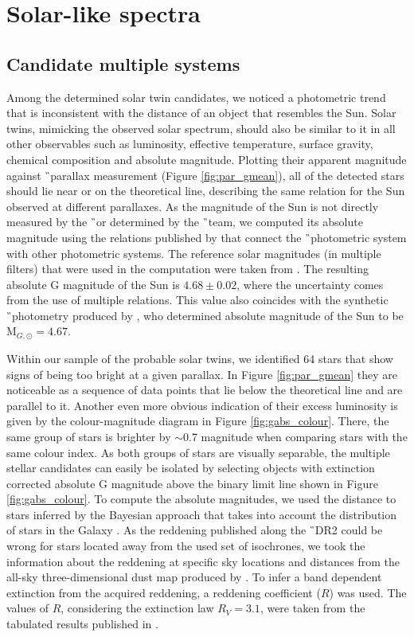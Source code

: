 \section{Solar-like spectra}
\subsection{Candidate multiple systems}
\label{sec:multi_cand}
Among the determined solar twin candidates, we noticed a photometric trend that is inconsistent with the distance of an object that resembles the Sun. Solar twins, mimicking the observed solar spectrum, should also be similar to it in all other observables such as luminosity, effective temperature, surface gravity, chemical composition and absolute magnitude. Plotting their apparent magnitude against \G\ parallax measurement (Figure \ref{fig:par_gmean}), all of the detected stars should lie near or on the theoretical line, describing the same relation for the Sun observed at different parallaxes. As the magnitude of the Sun is not directly measured by the \G\ or determined by the \G\ team, we computed its absolute magnitude using the relations published by \citet{2018arXiv180409368E} that connect the \G\ photometric system with other photometric systems. The reference solar magnitudes (in multiple filters) that were used in the computation were taken from \citet{2018ApJS..236...47W}. The resulting absolute G magnitude of the Sun is $4.68 \pm 0.02$, where the uncertainty comes from the use of multiple relations. This value also coincides with the synthetic \G\ photometry produced by \citet{2018MNRAS.479L.102C}, who determined absolute magnitude of the Sun to be M$_{G, \odot} = 4.67$.

Within our sample of the probable solar twins, we identified 64 stars that show signs of being too bright at a given parallax. In Figure \ref{fig:par_gmean} they are noticeable as a sequence of data points that lie below the theoretical line and are parallel to it. Another even more obvious indication of their excess luminosity is given by the colour-magnitude diagram in Figure \ref{fig:gabs_colour}. There, the same group of stars is brighter by $\sim$0.7 magnitude when comparing stars with the same colour index. As both groups of stars are visually separable, the multiple stellar candidates can easily be isolated by selecting objects with extinction corrected absolute G magnitude above the binary limit line shown in Figure \ref{fig:gabs_colour}. To compute the absolute magnitudes, we used the distance to stars inferred by the Bayesian approach that takes into account the distribution of stars in the Galaxy \cite{2018AJ....156...58B}. As the reddening published along the \G\ DR2 \cite{2018A&A...616A...8A} could be wrong for stars located away from the used set of isochrones, we took the information about the reddening at specific sky locations and distances from the all-sky three-dimensional dust map produced by \citet{2017A&A...606A..65C}. To infer a band dependent extinction from the acquired reddening, a reddening coefficient ($R$) was used. The values of $R$, considering the extinction law $R_V = 3.1$, were taken from the tabulated results published in \citet{2011ApJ...737..103S}. 

